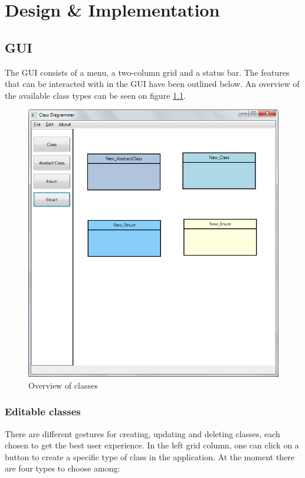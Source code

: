 \chapter{Design \& Implementation}
\label{sec:design_and_implementation}

\section{GUI}
\label{sec:gui}

The GUI consists of a menu, a two-column grid and a status bar. The features that can be interacted with in the GUI have been outlined below. An overview of the available class types can be seen on figure \ref{fig:one_each}.

\begin{figure}[htbp]
   \centering
   \includegraphics[width=1\linewidth]{figure/one_of_each}
   \caption{Overview of classes}
   \label{fig:one_each}
\end{figure}


\subsection{Editable classes}

There are different gestures for creating, updating and deleting classes, each chosen to get the best user experience. In the left grid column, one can click on a button to create a specific type of class in the application. At the moment there are four types to choose among:

